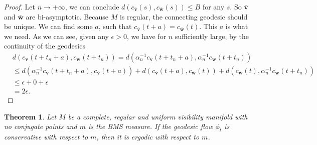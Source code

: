 \documentclass[reqno,11pt]{article}
\newtheorem{theorem}{Theorem}[section]
\theoremstyle{definition}
\theoremstyle{remark}
\numberwithin{equation}{section}
\begin{document}
\begin{proof}
    Let $n\to +\infty$, we can conclude $d(c_{\bar{\bm{v}}}(s),c_{\bar{\bm{w}}}(s))\leq B$ for any $s$. So $\bar{\bm{v}}$ and $\bar{\bm{w}}$ are bi-asymptotic. Because $M$ is regular, the connecting geodesic should be unique. We can find some $a$, such that $c_{\bar{\bm{v}}}(t+a)= c_{\bar{\bm{w}}}(t)$. This $a$ is what we need. As we can see, given any $\epsilon>0$, we have for $n$ sufficiently large, by the continuity of the geodesics
    \begin{displaymath}
        \begin{aligned}
            &d(c_{\bm{v}}(t+t_n+a),c_{\bm{w}}(t+t_n))=d(\alpha_n^{-1}c_{\bm{v}}(t+t_n+a),\alpha_n^{-1}c_{\bm{w}}(t+t_n))\\
                                                    &\leq d(\alpha_n^{-1}c_{\bm{v}}(t+t_n+a),c_{\bar{\bm{v}}}(t+a))+d(c_{\bar{\bm{v}}}(t+a),c_{\bar{\bm{w}}}(t))+d(c_{\bar{\bm{w}}}(t),\alpha_n^{-1}c_{\bm{w}}(t+t_n))\\
                                                    &\leq \epsilon+0+\epsilon\\
                                                    &=2\epsilon.   
        \end{aligned}
    \end{displaymath}
\end{proof}

\begin{theorem}\label{thm_6_6}
	Let $M$ be a complete, regular and uniform visibility manifold with no conjugate points and $m$ is the BMS measure. If the geodesic flow $\phi_t$ is conservative with respect to $m$, then it is ergodic with respect to $m$.
\end{theorem}
\end{document}
